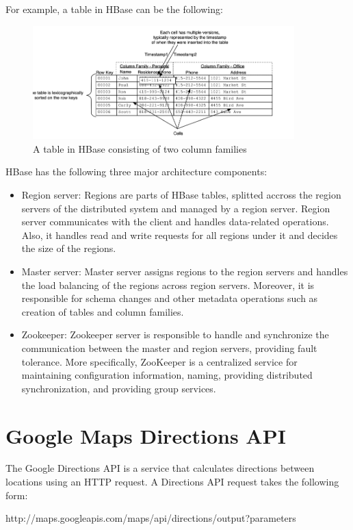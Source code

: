 For example, a table in HBase can be the following:

\begin{figure}[H]
  \centering
  \includegraphics[width=0.9\textwidth]{figures/hbase.png}
  \caption{A table in HBase consisting of two column families}
\end{figure}

HBase has the following three major architecture components:

\begin{itemize}
 \item Region server: Regions are parts of HBase tables, splitted accross the region servers of the distributed system and managed by a region server. 
 Region server communicates with the client and handles data-related operations. Also, it handles read and write requests for all regions under it and decides 
 the size of the regions.
 \item Master server: Master server assigns regions to the region servers and handles the load balancing of the regions across region servers. Moreover, it is 
 responsible for schema changes and other metadata operations such as creation of tables and column families. 
 \item Zookeeper: Zookeeper server is responsible to handle and synchronize the communication between the master and region servers, providing 
 fault tolerance. More specifically, ZooKeeper is a centralized service for maintaining configuration information, naming, providing distributed 
 synchronization, and providing group services.
\end{itemize}


\section{Google Maps Directions API}

The Google Directions API \cite{16} is a service that calculates directions between locations using an HTTP request. A Directions API request takes the following form:
\begin{center}
  http://maps.googleapis.com/maps/api/directions/output?parameters
\end{center}

